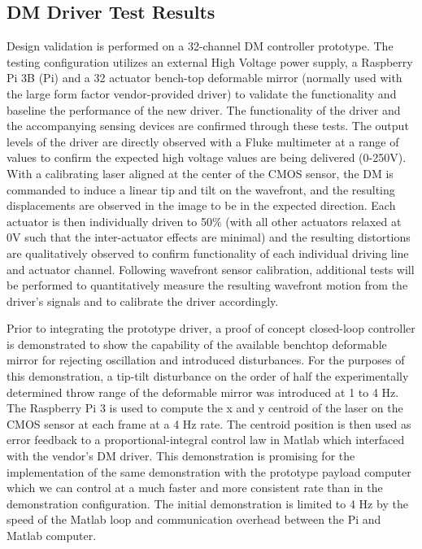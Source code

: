 \documentclass[]{spie}  %
\begin{document}
\subsection{DM Driver Test Results}%
\label{ssec:elec_test}
Design validation is performed on a 32-channel DM controller prototype. The testing configuration utilizes an external High Voltage power supply, a Raspberry Pi 3B (Pi) and a 32 actuator bench-top deformable mirror (normally used with the large form factor vendor-provided driver) to validate the functionality and baseline the performance of the new driver.  The functionality of the driver and the accompanying sensing devices are confirmed through these tests.  The output levels of the driver are directly observed with a Fluke multimeter at a range of values to confirm the expected high voltage values are being delivered (0-250V). With a calibrating laser aligned at the center of the CMOS sensor, the DM is commanded to induce a linear tip and tilt on the wavefront, and the resulting displacements are observed in the image to be in the expected direction.  Each actuator is then individually driven to 50\% (with all other actuators relaxed at 0V such that the inter-actuator effects are minimal) and the resulting distortions are qualitatively observed to confirm functionality of each individual driving line and actuator channel. Following wavefront sensor calibration, additional tests will be performed to quantitatively measure the resulting wavefront motion from the driver's signals and to calibrate the driver accordingly. 

Prior to integrating the prototype driver, a proof of concept closed-loop controller is demonstrated to show the capability of the available benchtop deformable mirror for rejecting oscillation and introduced disturbances.  For the purposes of this demonstration, a tip-tilt disturbance on the order of half the experimentally determined throw range of the deformable mirror was introduced at 1 to 4 Hz. The Raspberry Pi 3 is used to compute the x and y centroid of the laser on the CMOS sensor at each frame at a 4 Hz rate. The centroid position is then used as error feedback to a proportional-integral control law in Matlab which interfaced with the vendor's DM driver.  This demonstration is promising for the implementation of the same demonstration with the prototype payload computer which we can control at a much faster and more consistent rate than in the demonstration configuration. The initial demonstration is limited to 4 Hz by the speed of the Matlab loop and communication overhead between the Pi and Matlab computer.
\end{document}
